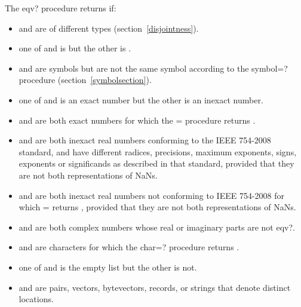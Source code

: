 \begin{entry}{%
}
The {\cf eqv?} procedure returns \schfalse{} if:

\begin{itemize}
\item {} and  are of different types
(section~\ref{disjointness}).

\item one of  and  is \schtrue{} but the other is
\schfalse{}.

\item {} and  are symbols but are not the same
symbol according to the {\cf symbol=?} procedure
(section~\ref{symbolsection}).

\item one of  and  is an exact number but the other
is an inexact number.


\item {} and  are both exact numbers for which
the {\cf =} procedure returns \schfalse{}.

\item {} and  are both inexact real numbers
conforming to the IEEE 754-2008 standard, and have different radices,
precisions, maximum exponents, signs, exponents or significands as
described in that standard, 
provided that they are not both representations of NaNs.

\item {} and  are both inexact real numbers
not conforming to IEEE 754-2008 for which {\cf =} returns \schfalse{},
provided that they are not both representations of NaNs.

\item {} and  are both complex numbers whose
real or imaginary parts are not {\cf eqv?}.

\item {} and  are characters for which the {\cf char=?}
procedure returns \schfalse{}.

\item one of  and  is the empty list but the other
is not.

\item {} and  are pairs, vectors, bytevectors, records,
or strings that denote distinct locations.


\end{itemize}
\end{entry}

